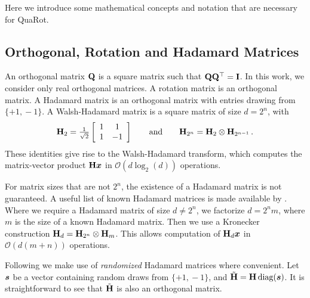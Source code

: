 Here we introduce some mathematical concepts and notation that are necessary for QuaRot. 

\subsection{Orthogonal, Rotation and Hadamard Matrices}
An orthogonal matrix ${\mathbf{Q}}$ is a square matrix such that ${\mathbf{Q}}{\mathbf{Q}}^\top={\mathbf{I}}$. In this work, we consider only real orthogonal matrices. A rotation matrix is an orthogonal matrix.
A Hadamard matrix is an orthogonal matrix with entries drawing from  $\{+1,\!-1\}$. A Walsh-Hadamard matrix is a square matrix of size $d=2^n$, with
\begin{align}
    {\mathbf{H}}_2 = \tfrac{1}{\sqrt{2}}\left[\begin{array}{cc}
    1&1\\1&-1\end{array}\right]
    \qquad\textrm{and} \qquad {\mathbf{H}}_{2^n} = {\mathbf{H}}_2 \otimes {\mathbf{H}}_{2^{n-1}}\,.
\end{align}
These identities give rise to the Walsh-Hadamard transform, which computes the matrix-vector product ${\mathbf{H}} {\bm{x}}$ in $\mathcal O(d \log_2(d))$ operations.

For matrix sizes that are not $2^n$, the existence of a Hadamard matrix is not guaranteed. A useful list of known Hadamard matrices is made available by \citet{hadamard_matrix_list}. Where we require a Hadamard matrix of size $d\neq2^n$, we factorize $d=2^nm$, where $m$ is the size of a known Hadamard matrix. Then we use a Kronecker construction ${\mathbf{H}}_d = {\mathbf{H}}_{2^n}\otimes {\mathbf{H}}_m$. This allows computation of ${\mathbf{H}}_d{\bm{x}}$ in $\mathcal O(d(m+n))$ operations.  

Following \citet{QuIPsharp} we make use of \emph{randomized} Hadamard matrices where convenient. Let~${\bm{s}}$ be a vector containing random draws from $\{+1,\!-1\}$, and $\tilde {{\mathbf{H}}} = {\mathbf{H}}\,\textrm{diag}({\bm{s}})$. It is straightforward to see that $\tilde {{\mathbf{H}}}$ is also an orthogonal matrix. 

